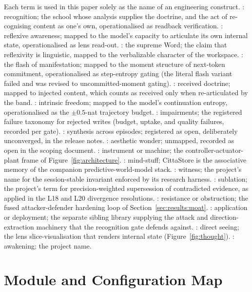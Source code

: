Each term is used in this paper solely as the name of an engineering construct. : recognition; the school whose analysis supplies the doctrine, and the act of re-cognising content as one's own, operationalised as readback verification. : reflexive awareness; mapped to the model's capacity to articulate its own internal state, operationalised as lens read-out. : the supreme Word; the claim that reflexivity is linguistic, mapped to the verbalizable character of the workspace. : the flash of manifestation; mapped to the moment structure of next-token commitment, operationalised as step-entropy gating (the literal flash variant failed and was revised to uncommitted-moment gating). : received doctrine; mapped to injected content, which counts as received only when re-articulated by the band. : intrinsic freedom; mapped to the model's continuation entropy, operationalised as the $\pm0.5$-nat trajectory budget. : impairments; the registered failure taxonomy for rejected writes (budget, uptake, and quality failures, recorded per gate). : synthesis across episodes; registered as open, deliberately unconverged, in the release notes. : aesthetic wonder; unmapped, recorded as open in the scoping document. : instrument or machine; the controller-actuator-plant frame of Figure~\ref{fig:architecture}. : mind-stuff; CittaStore is the associative memory of the companion predictive-world-model stack. : witness; the project's name for the session-stable invariant enforced by its research harness. : sublation; the project's term for precision-weighted supersession of contradicted evidence, as applied in the L18 and L20 divergence resolutions. : resistance or obstruction; the fused attacker-defender hardening loop of Section~\ref{sec:results:moat}. : application or deployment; the separate sibling library supplying the attack and direction-extraction machinery that the recognition gate defends against. : direct seeing; the lens slice-visualisation that renders internal state (Figure~\ref{fig:thought}). : awakening; the project name.

\section{Module and Configuration Map}
\label{app:modules}

